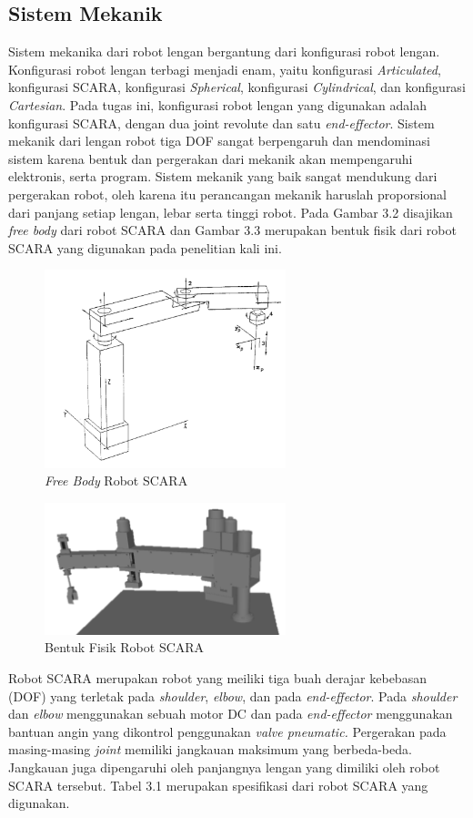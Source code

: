 \subsection{ Sistem Mekanik }
Sistem mekanika dari robot lengan bergantung dari konfigurasi robot lengan. Konfigurasi robot lengan terbagi menjadi enam, yaitu konfigurasi \textit{Articulated}, konfigurasi SCARA, konfigurasi \textit{Spherical}, konfigurasi \textit{Cylindrical}, dan konfigurasi \textit{Cartesian}. Pada tugas ini, konfigurasi robot lengan yang digunakan adalah konfigurasi SCARA, dengan dua joint revolute dan satu \textit{end-effector}. Sistem mekanik dari lengan robot tiga DOF sangat berpengaruh dan mendominasi sistem karena bentuk dan pergerakan dari mekanik akan mempengaruhi elektronis, serta program. Sistem mekanik yang baik sangat mendukung dari pergerakan robot, oleh karena itu perancangan mekanik haruslah proporsional dari panjang setiap lengan, lebar serta tinggi robot. Pada Gambar 3.2 disajikan \textit{free body} dari robot SCARA dan Gambar 3.3 merupakan bentuk fisik dari robot SCARA yang digunakan pada penelitian kali ini.
\begin{figure}[H]
	\centering
	\includegraphics[width=7cm]{gambar/scaraa.png}
	\caption{\textit{Free Body} Robot SCARA}
\end{figure}
\begin{figure}[H]
	\centering
	\includegraphics[width=7cm]{gambar/3dscara.png}
	\caption{Bentuk Fisik Robot SCARA}
\end{figure}
Robot SCARA merupakan robot yang meiliki tiga buah derajar kebebasan (DOF) yang terletak pada \textit{shoulder}, \textit{elbow}, dan pada \textit{end-effector}. Pada \textit{shoulder} dan \textit{elbow} menggunakan sebuah motor DC dan pada \textit{end-effector} menggunakan bantuan angin yang dikontrol penggunakan \textit{valve pneumatic.} Pergerakan pada masing-masing \textit{joint} memiliki jangkauan maksimum yang berbeda-beda. Jangkauan juga dipengaruhi oleh panjangnya lengan yang dimiliki oleh robot SCARA tersebut. Tabel 3.1 merupakan spesifikasi dari robot SCARA yang digunakan.


